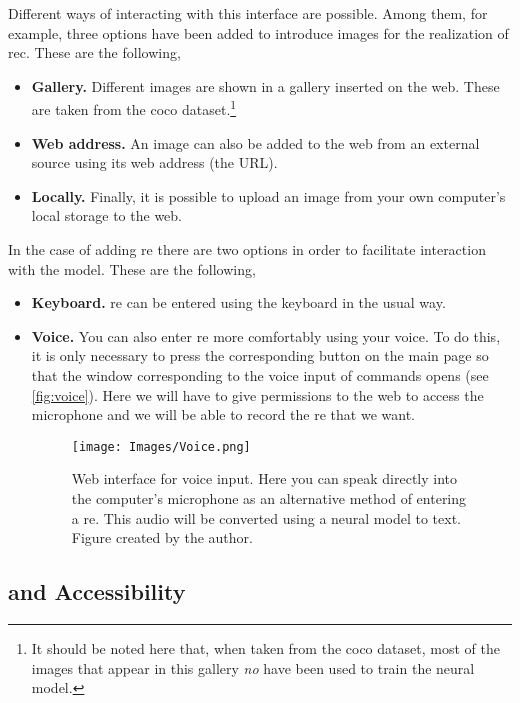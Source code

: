 Different ways of interacting with this interface are possible. Among them, for
example, three options have been added to introduce images for the realization
of \gls{rec}. These are the following,
\begin{itemize}
  \item \textbf{Gallery.} Different images are shown in a gallery inserted on
  the web. These are taken from the \gls{coco} dataset.\footnote{It should be
    noted here that, when taken from the \gls{coco} dataset, most of the images
    that appear in this gallery \emph{no} have been used to train the neural
    model.}
  \item \textbf{Web address.} An image can also be added to the web from an
  external source using its web address (the URL).
  \item \textbf{Locally.} Finally, it is possible to upload an image from your
  own computer's local storage to the web.
\end{itemize}

In the case of adding \gls{re} there are two options in order to facilitate
interaction with the model. These are the following,
\begin{itemize}
  \item \textbf{Keyboard.} \gls{re} can be entered using the keyboard in the
  usual way.
  \item \textbf{Voice.} You can also enter \gls{re} more comfortably using your
  voice. To do this, it is only necessary to press the corresponding button on
  the main page so that the window corresponding to the voice input of commands
  opens (see \vref{fig:voice}). Here we will have to give permissions to the
  web to access the microphone and we will be able to record the \gls{re} that
  we want.
  \begin{figure}[ht]
    \centering
    \texttt{[image: Images/Voice.png]}
    \caption[Web interface for voice input]{Web interface for voice input. Here
      you can speak directly into the computer's microphone as an alternative
      method of entering a \gls{re}. This audio will be converted using a
      neural model to text. Figure created by the author.}%
    \label{fig:voice}
  \end{figure}
\end{itemize}


\subsection{ and Accessibility}%

